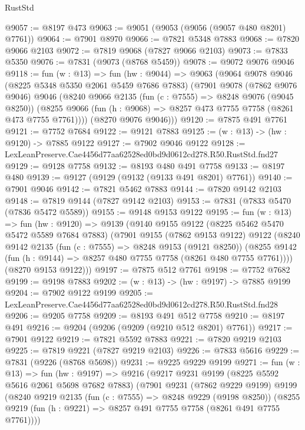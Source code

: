 \begin{lexlean}{RustStd}
\begin{coremodule}
@9057 := @8197 @473
@9063 := @9051 (@9053 (@9056 (@9057 @480 @8201) @7761))
@9064 := @7901 @8970
@9066 := @7821 @5348 @7883
@9068 := @7820 @9066 @2103
@9072 := @7819 @9068 (@7827 @9066 @2103)
@9073 := @7833 @5350
@9076 := @7831 (@9073 (@8768 @5459))
@9078 := @9072 @9076 @9046
@9118 := fun (w : @13) =>
  fun (hw : @9044) =>
  @9063
    (@9064
      @9078
      @9046
      (@8225 @5348 @5350 @2061 @5459 @7686 @7883)
      (@7901
        @9078
        (@7862 @9076 @9046)
        @9046
        (@8240
          @9066
          @2135
          (fun (c : @7555) => @8248 @9076 (@9045 @8250))
          (@8255 @9066 (fun (h : @9068) => @8257 @473 @7755 @7758 (@8261 @473 @7755 @7761))))
        (@8270 @9076 @9046)))
@9120 := @7875 @491 @7761
@9121 := @7752 @7684
@9122 := @9121 @7883
@9125 := (w : @13) -> (hw : @9120) -> @7885 @9122
@9127 := @7902 @9046 @9122
@9128 := LexLeanPreserve.Cae4456d77aa62528ed0bd9d0612cd278.R50.RustStd.fnd27
@9129 := @9128 @7758
@9132 := @8193 @480 @491 @7758
@9133 := @8197 @480
@9139 := @9127 (@9129 (@9132 (@9133 @491 @8201) @7761))
@9140 := @7901 @9046
@9142 := @7821 @5462 @7883
@9144 := @7820 @9142 @2103
@9148 := @7819 @9144 (@7827 @9142 @2103)
@9153 := @7831 (@7833 @5470 (@7836 @5472 @5589))
@9155 := @9148 @9153 @9122
@9195 := fun (w : @13) =>
  fun (hw : @9120) =>
  @9139
    (@9140
      @9155
      @9122
      (@8225 @5462 @5470 @5472 @5589 @7684 @7883)
      (@7901
        @9155
        (@7862 @9153 @9122)
        @9122
        (@8240
          @9142
          @2135
          (fun (c : @7555) => @8248 @9153 (@9121 @8250))
          (@8255 @9142 (fun (h : @9144) => @8257 @480 @7755 @7758 (@8261 @480 @7755 @7761))))
        (@8270 @9153 @9122)))
@9197 := @7875 @512 @7761
@9198 := @7752 @7682
@9199 := @9198 @7883
@9202 := (w : @13) -> (hw : @9197) -> @7885 @9199
@9204 := @7902 @9122 @9199
@9205 := LexLeanPreserve.Cae4456d77aa62528ed0bd9d0612cd278.R50.RustStd.fnd28
@9206 := @9205 @7758
@9209 := @8193 @491 @512 @7758
@9210 := @8197 @491
@9216 := @9204 (@9206 (@9209 (@9210 @512 @8201) @7761))
@9217 := @7901 @9122
@9219 := @7821 @5592 @7883
@9221 := @7820 @9219 @2103
@9225 := @7819 @9221 (@7827 @9219 @2103)
@9226 := @7833 @5616
@9229 := @7831 (@9226 (@8768 @5698))
@9231 := @9225 @9229 @9199
@9271 := fun (w : @13) =>
  fun (hw : @9197) =>
  @9216
    (@9217
      @9231
      @9199
      (@8225 @5592 @5616 @2061 @5698 @7682 @7883)
      (@7901
        @9231
        (@7862 @9229 @9199)
        @9199
        (@8240
          @9219
          @2135
          (fun (c : @7555) => @8248 @9229 (@9198 @8250))
          (@8255 @9219 (fun (h : @9221) => @8257 @491 @7755 @7758 (@8261 @491 @7755 @7761))))

\end{coremodule}
\end{lexlean}
